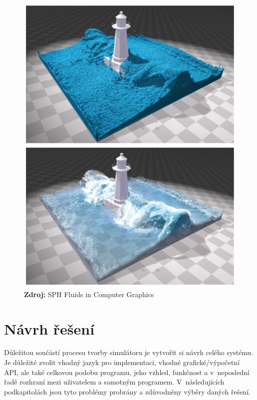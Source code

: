 \begin{figure}[h]\centering
	\centering
	\captionsetup{justification=centering}
	\includegraphics[width=0.5\linewidth]{obrazky-figures/SPHSim1_01.jpg}\hfill
	\includegraphics[width=0.5\linewidth]{obrazky-figures/SPHSim1_02.jpg}\hfill
	\textbf{Zdroj: } SPH Fluids in Computer Graphics \cite{Ihmsen14}
	\label{fig:SPHFigure}
\end{figure}

\chapter{Návrh řešení}
\label{chapter:navrh_resení}
Důležitou součástí procesu tvorby simulátoru je vytvořit si návrh celého systému. Je důležité zvolit vhodný jazyk pro implementaci, vhodné grafické/výpočetní API, ale také celkovou podobu programu, jeho vzhled, funkčnost a v~neposlední řadě rozhraní mezi uživatelem a samotným programem. V~následujících podkapitolách jsou tyto problémy probrány a zdůvodněny výběry daných řešení. 

